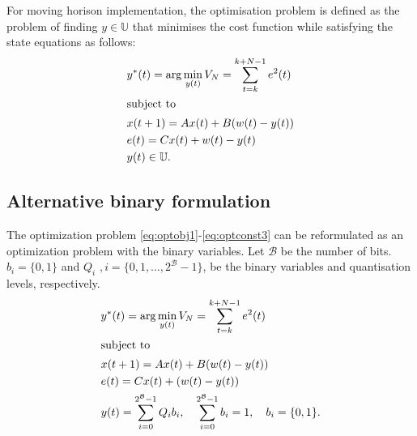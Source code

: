 \documentclass[a4paper]{article}
\begin{document}
For moving horison implementation, the optimisation problem is defined as the problem of finding $y \in \mathbb{U}$ that minimises  the cost function  while satisfying the state equations as follows:
\begin{align}
		& y^{\ast}(t) = \arg  \min_{y(t) }	V_{N}  = \sum_{t=k}^{k+N-1} e^{2}(t) \label{eq:optobj1}\\
		\intertext{subject to}
		&x(t+1) = A x(t) + B (w(t)-y(t))	\label{eq:optconst1}	\\
		&e(t) = Cx(t) + w(t)-y(t)	\label{eq:optconst2}	\\
		&y(t) \in \mathbb{U}. \label{eq:optconst3}
	\end{align}
\subsection{Alternative binary formulation}
The optimization problem \eqref{eq:optobj1}-\eqref{eq:optconst3} can be reformulated as an optimization problem with the binary variables. Let $\mathcal{B}$ be the number of bits.  $b_{i} = \{0,1\}$ and $Q_{i}$ $, i = \{0, 1, \ldots, 2^{\mathcal{B}}-1\}$, be the binary variables and quantisation levels, respectively. 
\begin{align}
		& y^{\ast}(t) = \arg  \min_{y(t) }	V_{N}  = \sum_{t=k}^{k+N-1} e^{2}(t) \label{eq:optobj12}\\
		\intertext{subject to}
		&x(t+1) = A x(t) + B (w(t)-y(t))	\label{eq:optconst12}	\\
		&e(t) = Cx(t) + (w(t)-y(t))	\label{eq:optconst22}	\\
		&y(t) = \sum_{i = 0}^{2^{\mathcal{B}}-1} Q_{i}b_{i}, \quad \sum_{i = 0}^{2^{\mathcal{B}}-1}b_{i}  =1, \quad b_{i} = \{0,1\}. \label{eq:optconst32} 
	\end{align}

\end{document}
